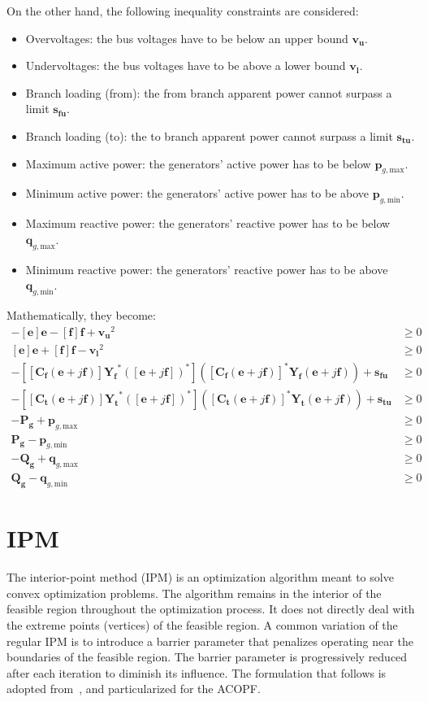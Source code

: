 \documentclass{article}
\begin{document}
On the other hand, the following inequality constraints are considered:
\begin{itemize}
    \item Overvoltages: the bus voltages have to be below an upper bound $\bm{v_u}$.
    \item Undervoltages: the bus voltages have to be above a lower bound $\bm{v_l}$.
    \item Branch loading (from): the from branch apparent power cannot surpass a limit $\bm{s_{fu}}$. 
    \item Branch loading (to): the to branch apparent power cannot surpass a limit $\bm{s_{tu}}$. 
    \item Maximum active power: the generators' active power has to be below $\bm{p}_{g,\text{max}}$.
    \item Minimum active power: the generators' active power has to be above $\bm{p}_{g,\text{min}}$.
    \item Maximum reactive power: the generators' reactive power has to be below $\bm{q}_{g,\text{max}}$.
    \item Minimum reactive power: the generators' reactive power has to be above $\bm{q}_{g,\text{min}}$.
\end{itemize}
Mathematically, they become:
\begin{align}
    - [\bm{e}]\bm{e} - [\bm{f}]\bm{f} + \bm{v_u}^2 & \geq 0 \\
    [\bm{e}]\bm{e} + [\bm{f}]\bm{f} - \bm{v_l}^2 & \geq 0 \\
    - [[\bm{C_f}(\bm{e} + j\bm{f})]\bm{Y_f}^* ([\bm{e} + j\bm{f}])^*] ([\bm{C_f}(\bm{e} + j\bm{f})]^* \bm{Y_f}(\bm{e} + j\bm{f})) + \bm{s_{fu}} & \geq 0 \\
    - [[\bm{C_t}(\bm{e} + j\bm{f})]\bm{Y_t}^* ([\bm{e} + j\bm{f}])^*] ([\bm{C_t}(\bm{e} + j\bm{f})]^* \bm{Y_t}(\bm{e} + j\bm{f})) + \bm{s_{tu}} & \geq 0 \\
    - \bm{P_g} + \bm{p}_{g,\text{max}} & \geq 0 \\
    \bm{P_g} - \bm{p}_{g,\text{min}} & \geq 0 \\
    - \bm{Q_g} + \bm{q}_{g,\text{max}} & \geq 0 \\
    \bm{Q_g} - \bm{q}_{g,\text{min}} & \geq 0
\end{align}

\section{IPM}
The interior-point method (IPM) is an optimization algorithm meant to solve convex optimization problems. The algorithm remains in the interior of the feasible region throughout the optimization process. It does not directly deal with the extreme points (vertices) of the feasible region. A common variation of the regular IPM is to introduce a barrier parameter that penalizes operating near the boundaries of the feasible region. The barrier parameter is progressively reduced after each iteration to diminish its influence. The formulation that follows is adopted from~\cite{nocedal1999numerical}, and particularized for the ACOPF.
\end{document}
